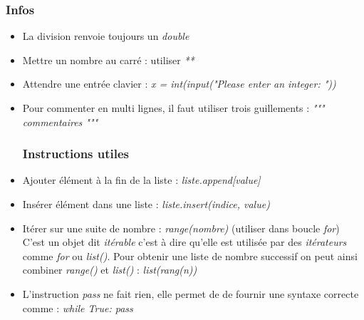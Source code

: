 \documentclass[12pt,a4paper]{article}
\begin{document}
\subsubsection{Infos}
\begin{itemize}
\item La division renvoie toujours un \textit{double}
\item Mettre un nombre au carré : utiliser \textit{**}
\item Attendre une entrée clavier : \textit{x = int(input("Please enter an integer: "))}
\item Pour commenter en multi lignes, il faut utiliser trois guillements : 
\newline \textit{""" commentaires """}

\subsubsection{Instructions utiles}
\item Ajouter élément à la fin de la liste : \textit{liste.append[value]}
\item Insérer élément dans une liste : \textit{liste.insert(indice, value)}
\item Itérer sur une suite de nombre : \textit{range(nombre)} (utiliser dans boucle \textit{for})
\newline C'est un objet dit \textit{itérable} c'est à dire qu'elle est utilisée par des \textit{itérateurs} comme \textit{for} ou \textit{list()}. Pour obtenir une liste de nombre successif on peut ainsi combiner \textit{range()} et \textit{list()} : \textit{list(rang(n))}
\item L'instruction \textit{pass} ne fait rien, elle permet de de fournir une syntaxe correcte comme : \textit{while True: pass}


\end{itemize}
\end{document}
